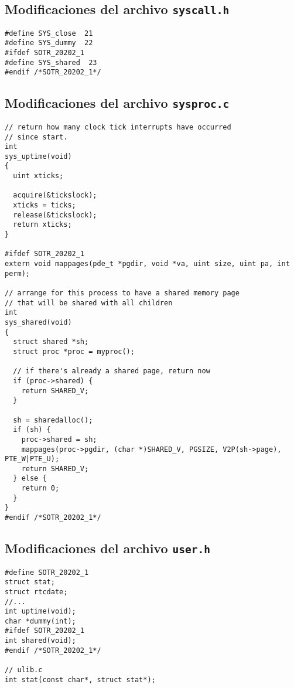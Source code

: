 \documentclass[12pt]{article}
\begin{document}
\subsection{Modif\/icaciones del archivo {\tt syscall.h}}
\begin{verbatim}
#define SYS_close  21
#define SYS_dummy  22
#ifdef SOTR_20202_1
#define SYS_shared  23
#endif /*SOTR_20202_1*/
\end{verbatim}
\subsection{Modif\/icaciones del archivo {\tt sysproc.c}}
\begin{verbatim}
// return how many clock tick interrupts have occurred
// since start.
int
sys_uptime(void)
{
  uint xticks;

  acquire(&tickslock);
  xticks = ticks;
  release(&tickslock);
  return xticks;
}

#ifdef SOTR_20202_1
extern void mappages(pde_t *pgdir, void *va, uint size, uint pa, int perm);

// arrange for this process to have a shared memory page
// that will be shared with all children
int
sys_shared(void)
{
  struct shared *sh;
  struct proc *proc = myproc();

  // if there's already a shared page, return now
  if (proc->shared) {
    return SHARED_V;
  }

  sh = sharedalloc();
  if (sh) {
    proc->shared = sh;
    mappages(proc->pgdir, (char *)SHARED_V, PGSIZE, V2P(sh->page), PTE_W|PTE_U);
    return SHARED_V;
  } else {
    return 0;
  }
}
#endif /*SOTR_20202_1*/
\end{verbatim}
\subsection{Modif\/icaciones del archivo {\tt user.h}}
\begin{verbatim}
#define SOTR_20202_1
struct stat;
struct rtcdate;
//...
int uptime(void);
char *dummy(int);
#ifdef SOTR_20202_1
int shared(void);
#endif /*SOTR_20202_1*/

// ulib.c
int stat(const char*, struct stat*);
\end{verbatim}
\end{document}

